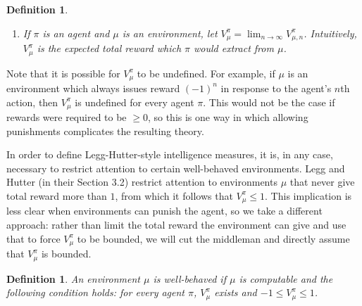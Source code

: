 \documentclass[runningheads]{llncs}
\newtheorem{mydefinition}[mytheorem]{Definition}
\begin{document}
\begin{mydefinition}
\begin{enumerate}
\begin{enumerate}
            on the probability measure $\mu(\bullet|\langle\rangle)$.
            \item $a_0\in\mathcal A$ is chosen randomly based on the probability
            measure $\pi(\bullet|o_0,r_0)$.
            \item
            For each $i>0$,
            $(o_i,r_i)\in\mathcal O\times\mathcal R$ is chosen randomly based on
            the probability measure
            $\mu(\bullet|o_0,r_0,a_0,\ldots,o_{i-1},r_{i-1},a_{i-1})$.
            \item
            For each $i>0$,
            $a_i\in\mathcal A$ is chosen randomly based on the probability measure
            $\pi(\bullet|o_0,r_0,a_0,\ldots,o_{i-1},r_{i-1},a_{i-1},o_i,r_i)$.
        \end{enumerate}
        \item
        If $\pi$ is an agent and $\mu$ is an environment,
        let $V^\pi_\mu=\lim_{n\to\infty}V^{\pi}_{\mu,n}$.
        Intuitively, $V^\pi_\mu$ is the expected total reward which $\pi$ would extract
        from $\mu$.
    \end{enumerate}
\end{mydefinition}

Note that it is possible for $V^\pi_\mu$ to be undefined.
For example, if $\mu$ is an environment which always issues
reward $(-1)^n$ in response to the agent's $n$th action,
then $V^\pi_\mu$ is undefined for every agent $\pi$.
This would not be the case if rewards were required to be $\geq 0$,
so this is one way in which allowing
punishments complicates the resulting theory.

In order to define Legg-Hutter-style
intelligence measures, it is, in any case, necessary to restrict attention to
certain well-behaved environments. Legg and Hutter (in their Section 3.2)
restrict attention to environments $\mu$ that never give total reward more than $1$,
from which it follows that $V^\pi_\mu\leq 1$. This implication is less clear
when environments can punish the agent, so we take a different approach:
rather than limit the total reward the environment can give and use that to
force $V^\pi_\mu$ to be bounded, we will cut the middleman and
directly assume that $V^\pi_\mu$ is bounded.

\begin{mydefinition}
    An environment $\mu$ is \emph{well-behaved} if $\mu$ is computable and the following
    condition holds: for every agent $\pi$, $V^\pi_\mu$ exists and
    $-1\leq V^\pi_\mu\leq 1$.
\end{mydefinition}
\end{document}
